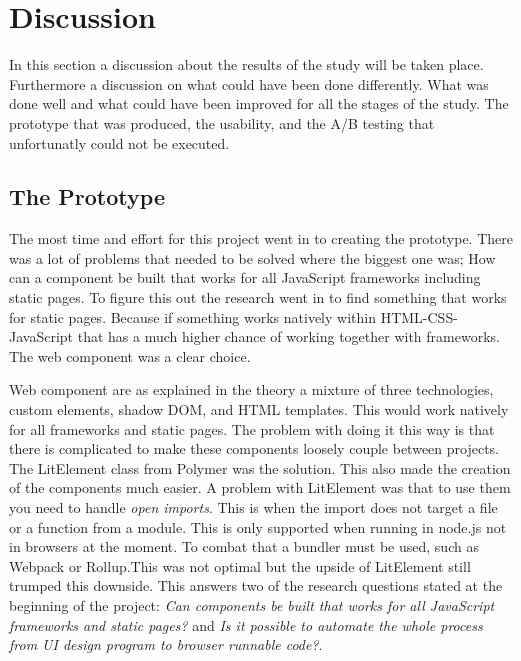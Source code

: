 \section{Discussion}

In this section a discussion about the results of the study will be taken place. Furthermore a discussion on what could have been done differently. What was done well and what could have been improved for all the stages of the study. The prototype that was produced, the usability, and the A/B testing that unfortunatly could not be executed.


\subsection{The Prototype}%
\label{sub:The Prototype}
The most time and effort for this project went in to creating the prototype. 
There was a lot of problems that needed to be solved where the biggest one was; How can a component be built that works for all JavaScript frameworks including static pages. To figure this out the research went in to find something that works for static pages. Because if something works natively within HTML-CSS-JavaScript that has a much higher chance of working together with frameworks. The web component was a clear choice.

Web component are as explained in the theory a mixture of three technologies, custom elements, shadow DOM, and HTML templates. This would work natively for all frameworks and static pages. The problem with doing it this way is that there is complicated to make these components loosely couple between projects. The LitElement class from Polymer was the solution. This also made the creation of the components much easier. A problem with LitElement was that to use them you need to handle \textit{open imports}. This is when the import does not target a file or a function from a module. This is only supported when running in node.js not in browsers at the moment. To combat that a bundler must be used, such as Webpack or Rollup.This was not optimal but the upside of LitElement still trumped this downside. This answers two of the research questions stated at the beginning of the project: \textit{Can components be built that works for all JavaScript frameworks and static pages?} and \textit{Is it possible to automate the whole process from UI design program to browser runnable code?}.


